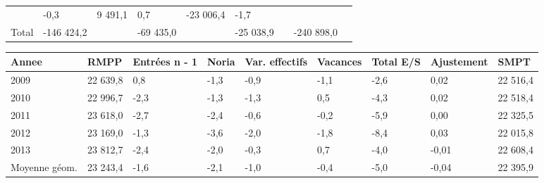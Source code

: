 \begin{longtable}[]{@{}lllllllll@{}}
\begin{minipage}[t]{0.16\columnwidth}
\end{minipage} & \begin{minipage}[t]{0.06\columnwidth}\raggedright
-0,3\strut
\end{minipage} & \begin{minipage}[t]{0.12\columnwidth}\raggedright
9 491,1\strut
\end{minipage} & \begin{minipage}[t]{0.06\columnwidth}\raggedright
0,7\strut
\end{minipage} & \begin{minipage}[t]{0.09\columnwidth}\raggedright
-23 006,4\strut
\end{minipage} & \begin{minipage}[t]{0.06\columnwidth}\raggedright
-1,7\strut
\end{minipage}\tabularnewline
\begin{minipage}[t]{0.05\columnwidth}\raggedright
Total\strut
\end{minipage} & \begin{minipage}[t]{0.10\columnwidth}\raggedright
-146 424,2\strut
\end{minipage} & \begin{minipage}[t]{0.06\columnwidth}\raggedright
\strut
\end{minipage} & \begin{minipage}[t]{0.16\columnwidth}\raggedright
-69 435,0\strut
\end{minipage} & \begin{minipage}[t]{0.06\columnwidth}\raggedright
\strut
\end{minipage} & \begin{minipage}[t]{0.12\columnwidth}\raggedright
-25 038,9\strut
\end{minipage} & \begin{minipage}[t]{0.06\columnwidth}\raggedright
\strut
\end{minipage} & \begin{minipage}[t]{0.09\columnwidth}\raggedright
-240 898,0\strut
\end{minipage} & \begin{minipage}[t]{0.06\columnwidth}\raggedright
\strut
\end{minipage}\tabularnewline
\bottomrule
\end{longtable}

\begin{longtable}[]{@{}lllllllll@{}}
\toprule
Annee & RMPP & Entrées n - 1 & Noria & Var. effectifs & Vacances & Total
E/S & Ajustement & SMPT\tabularnewline
\midrule
\endhead
2009 & 22 639,8 & 0,8 & -1,3 & -0,9 & -1,1 & -2,6 & 0,02 & 22
516,4\tabularnewline
2010 & 22 996,7 & -2,3 & -1,3 & -1,3 & 0,5 & -4,3 & 0,02 & 22
518,4\tabularnewline
2011 & 23 618,0 & -2,7 & -2,4 & -0,6 & -0,2 & -5,9 & 0,00 & 22
325,5\tabularnewline
2012 & 23 169,0 & -1,3 & -3,6 & -2,0 & -1,8 & -8,4 & 0,03 & 22
015,8\tabularnewline
2013 & 23 812,7 & -2,4 & -2,0 & -0,3 & 0,7 & -4,0 & -0,01 & 22
608,4\tabularnewline
Moyenne géom. & 23 243,4 & -1,6 & -2,1 & -1,0 & -0,4 & -5,0 & -0,04 & 22
395,9\tabularnewline
\bottomrule
\end{longtable}

